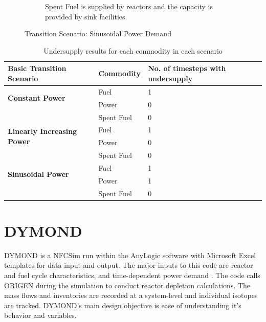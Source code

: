 \begin{figure}[]
\begin{subfigure}[t]{0.6\textwidth}
            \caption{Spent Fuel is supplied by reactors and the capacity is provided by sink facilities.}
            \label{fig:sinetransition-spentfuel}
        \end{subfigure}
        \caption{Transition Scenario: Sinusoidal Power Demand}
    \end{figure}
    
    \begin{table}[]
        \centering
        \caption {Undersupply results for each commodity in each scenario}
        \label{tab:transition-scenario-results}
        \begin{tabular}{|l|l|p{4cm}|}
        \hline
        \textbf{Basic Transition Scenario}    & \textbf{Commodity}    & \textbf{No. of timesteps with undersupply} \\ \hline
        \multirow{2}{*}{\textbf{Constant Power}} & Fuel & 1 \\ \cline{2-3}
                                                 & Power & 0 \\ \cline{2-3}
                                                 & Spent Fuel & 0 \\ \hline
        \multirow{2}{*}{\textbf{Linearly Increasing Power}} & Fuel & 1 \\ \cline{2-3}
                                                 & Power & 0 \\ \cline{2-3}
                                                 & Spent Fuel & 0 \\ \hline
        \multirow{2}{*}{\textbf{Sinusoidal Power}} & Fuel & 1 \\ \cline{2-3}
                                                 & Power & 1 \\ \cline{2-3}
                                                 & Spent Fuel & 0 \\ \hline
        \end{tabular}
    \end{table}

\section{DYMOND}
DYMOND \cite{yacout_modeling_2005} is a \gls{NFCSim} run within 
the AnyLogic software with Microsoft Excel templates for 
data input and output. 
The major inputs to this code are reactor and fuel cycle 
characteristics, and time-dependent power demand 
\cite{feng_standardized_2016}.   
The code calls ORIGEN \cite{bell_origen_1973} during the simulation 
to conduct reactor depletion calculations. 
The mass flows and inventories are recorded at a system-level
and individual isotopes are tracked. 
DYMOND's main design objective is ease of understanding it's 
behavior and variables. 

